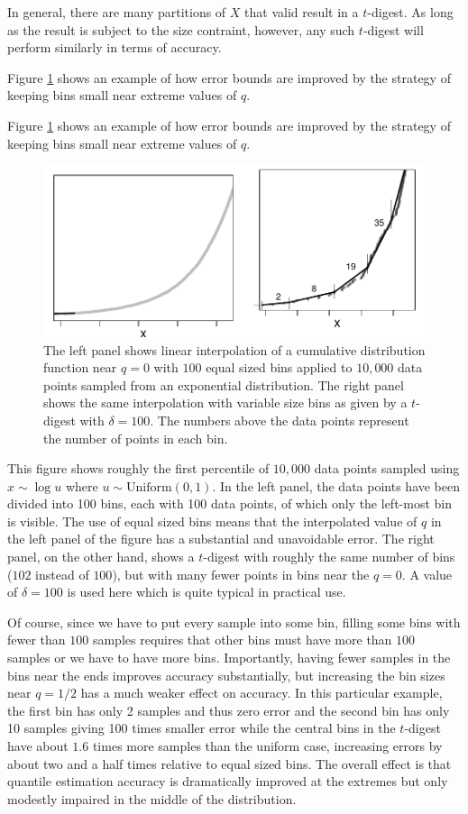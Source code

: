 \documentclass[11pt]{amsart}
\begin{document}
In general, there are many partitions of $X$ that valid result in a $t$-digest. As long as the result is subject to the size contraint, however, any such $t$-digest will perform similarly in terms of accuracy.

Figure \ref{fig:linear-interpolation} shows an example of how error bounds are improved by the strategy of keeping bins small near extreme values of $q$. 


Figure \ref{fig:linear-interpolation} shows an example of how error bounds are improved by the strategy of keeping bins small near extreme values of $q$. 

\begin{figure}[h] %
   \centering
   \includegraphics[height=2.in, clip]{linear-interpolation.pdf} 
   \caption{The left panel shows linear interpolation of a cumulative distribution function near $q=0$ with $100$ equal sized bins applied to $10,000$ data points sampled from an exponential distribution. The right panel shows the same interpolation with variable size bins as given by a $t$-digest with $\delta=100$. The numbers above the data points represent the number of points in each bin. }
   \label{fig:linear-interpolation}
\end{figure}
This figure shows roughly the first percentile of $10,000$ data points sampled using $x \sim \log u$ where $u \sim \mathrm{Uniform}(0,1)$. In the left panel, the data points have been divided into 100 bins, each with 100 data points, of which only the left-most bin is visible. The use of equal sized bins means that the interpolated value of $q$ in the left panel of the figure has a substantial and unavoidable error. The right panel, on the other hand, shows a $t$-digest with roughly the same number of bins ($102$ instead of $100$), but with many fewer points in bins near the $q=0$. A value of $\delta=100$ is used here which is quite typical in practical use. 

Of course, since we have to put every sample into some bin, filling some bins with fewer than $100$ samples requires that other bins must have more than $100$ samples or we have to have more bins. Importantly, having fewer samples in the bins near the ends improves accuracy substantially, but increasing the bin sizes near $q=1/2$ has a much weaker effect on accuracy. In this particular example, the first bin has only 2 samples and thus zero error and the second bin has only 10 samples giving 100 times smaller error while the central bins in the $t$-digest have about $1.6$ times more samples than the uniform case, increasing errors by about two and a half times relative to equal sized bins. The overall effect is that quantile estimation accuracy is dramatically improved at the extremes but only modestly impaired in the middle of the distribution.
\end{document}
